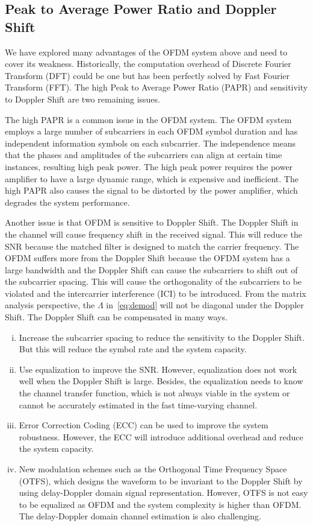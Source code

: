 \subsection{Peak to Average Power Ratio and Doppler Shift}
We have explored many advantages of the OFDM system above and need to cover its weakness. Historically, the computation overhead of Discrete Fourier Transform (DFT) could be one but has been perfectly solved by Fast Fourier Transform (FFT). The high Peak to Average Power Ratio (PAPR) and sensitivity to Doppler Shift are two remaining issues.

The high PAPR is a common issue in the OFDM system. The OFDM system employs a large number of subcarriers in each OFDM symbol duration and has independent information symbols on each subcarrier. The independence means that the phases and amplitudes of the subcarriers can align at certain time instances, resulting high peak power. The high peak power requires the power amplifier to have a large dynamic range, which is expensive and inefficient. The high PAPR also causes the signal to be distorted by the power amplifier, which degrades the system performance.

Another issue is that OFDM is sensitive to Doppler Shift. The Doppler Shift in the channel will cause frequency shift in the received signal. This will reduce the SNR because the matched filter is designed to match the carrier frequency. The OFDM suffers more from the Doppler Shift because the OFDM system has a large bandwidth and the Doppler Shift can cause the subcarriers to shift out of the subcarrier spacing. This will cause the orthogonality of the subcarriers to be violated and the intercarrier interference (ICI) to be introduced. From the matrix analysis perspective, the $\Lambda$ in~\cref{eq:demod} will not be diagonal under the Doppler Shift. The Doppler Shift can be compensated in many ways.
\begin{enumerate}[(i)]
    \item Increase the subcarrier spacing to reduce the sensitivity to the Doppler Shift. But this will reduce the symbol rate and the system capacity.
    \item Use equalization to improve the SNR. However, equalization does not work well when the Doppler Shift is large. Besides, the equalization needs to know the channel transfer function, which is not always viable in the system or cannot be accurately estimated in the fast time-varying channel.
    \item Error Correction Coding (ECC) can be used to improve the system robustness. However, the ECC will introduce additional overhead and reduce the system capacity.
    \item New modulation schemes such as the Orthogonal Time Frequency Space (OTFS), which designs the waveform to be invariant to the Doppler Shift by using delay-Doppler domain signal representation. However, OTFS is not easy to be equalized as OFDM and the system complexity is higher than OFDM. The delay-Doppler domain channel estimation is also challenging.
\end{enumerate}

